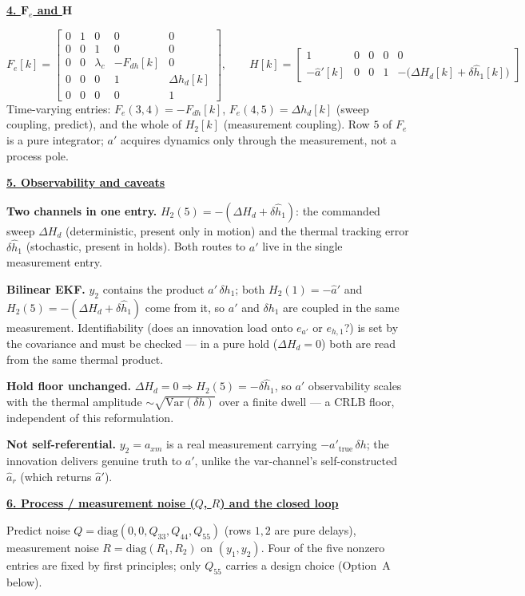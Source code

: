 \documentclass[11pt,a4paper,fontset=none]{ctexart}
\newcommand{\lc}{\lambda_c}
\newcommand{\ap}{a'}
\newcommand{\aph}{\hat a'}
\newcommand{\eap}{e_{a'}}
\newcommand{\DHd}{\Delta H_d}
\newcommand{\Dh}{\Delta h_d}
\newcommand{\hd}[1]{\par\medskip\noindent\underline{\textbf{#1}}\par\nobreak\vspace{0.2ex}}
\begin{document}
\hd{4. $\mathbf F_e$ and $\mathbf H$}

\[
F_e[k] =
\begin{bmatrix}
0 & 1 & 0 & 0 & 0 \\
0 & 0 & 1 & 0 & 0 \\
0 & 0 & \lc & -F_{dh}[k] & 0 \\
0 & 0 & 0 & 1 & \Dh[k] \\
0 & 0 & 0 & 0 & 1
\end{bmatrix},
\qquad
H[k] =
\begin{bmatrix}
1 & 0 & 0 & 0 & 0 \\
-\aph[k] & 0 & 0 & 1 & -\big(\DHd[k]+\delta\hat h_1[k]\big)
\end{bmatrix}
\]
Time-varying entries: $F_e(3,4)=-F_{dh}[k]$, $F_e(4,5)=\Dh[k]$ (sweep coupling,
predict), and the whole of $H_2[k]$ (measurement coupling). Row $5$ of $F_e$ is a
pure integrator; $a'$ acquires dynamics only through the measurement, not a
process pole.

\hd{5. Observability and caveats}

\textbf{Two channels in one entry.}
$H_2(5) = -(\DHd+\delta\hat h_1)$: the commanded sweep $\DHd$ (deterministic,
present only in motion) and the thermal tracking error $\delta\hat h_1$
(stochastic, present in holds). Both routes to $a'$ live in the single
measurement entry.

\textbf{Bilinear EKF.} $y_2$ contains the product $\ap\,\delta h_1$; both
$H_2(1)=-\aph$ and $H_2(5)=-(\DHd+\delta\hat h_1)$ come from it, so $a'$ and
$\delta h_1$ are coupled in the same measurement. Identifiability (does an
innovation load onto $\eap$ or $e_{h,1}$?) is set by the covariance and must be
checked --- in a pure hold ($\DHd=0$) both are read from the same thermal product.

\textbf{Hold floor unchanged.} $\DHd=0 \Rightarrow H_2(5)=-\delta\hat h_1$, so
$a'$ observability scales with the thermal amplitude $\sim\!\sqrt{\mathrm{Var}(\delta h)}$
over a finite dwell --- a CRLB floor, independent of this reformulation.

\textbf{Not self-referential.} $y_2=a_{xm}$ is a real measurement carrying
$-\ap_{\mathrm{true}}\,\delta h$; the innovation delivers genuine truth to $a'$,
unlike the var-channel's self-constructed $\hat a_r$ (which returns $\aph$).

\hd{6. Process / measurement noise ($Q$, $R$) and the closed loop}

Predict noise $Q=\mathrm{diag}(0,0,Q_{33},Q_{44},Q_{55})$ (rows $1,2$ are pure
delays), measurement noise $R=\mathrm{diag}(R_1,R_2)$ on $(y_1,y_2)$. Four of the
five nonzero entries are fixed by first principles; only $Q_{55}$ carries a design
choice (Option~A below).
\end{document}
